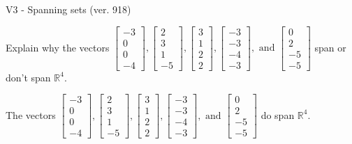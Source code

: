 \begin{exercise}
  \begin{exerciseTitle}V3 - Spanning sets (ver. 918)\end{exerciseTitle}
  \begin{exerciseStatement}
    Explain why the vectors \(\left[\begin{array}{r}
-3 \\
0 \\
0 \\
-4
\end{array}\right] , \left[\begin{array}{r}
2 \\
3 \\
1 \\
-5
\end{array}\right] , \left[\begin{array}{r}
3 \\
1 \\
2 \\
2
\end{array}\right] , \left[\begin{array}{r}
-3 \\
-3 \\
-4 \\
-3
\end{array}\right] , \text{ and } \left[\begin{array}{r}
0 \\
2 \\
-5 \\
-5
\end{array}\right]\) span or don't span \(\mathbb{R}^4\). 
	


  \end{exerciseStatement}
  \begin{exerciseAnswer}
   The vectors \(\left[\begin{array}{r}
-3 \\
0 \\
0 \\
-4
\end{array}\right] , \left[\begin{array}{r}
2 \\
3 \\
1 \\
-5
\end{array}\right] , \left[\begin{array}{r}
3 \\
1 \\
2 \\
2
\end{array}\right] , \left[\begin{array}{r}
-3 \\
-3 \\
-4 \\
-3
\end{array}\right] , \text{ and } \left[\begin{array}{r}
0 \\
2 \\
-5 \\
-5
\end{array}\right]\) 
  	 do  
	span \(\mathbb{R}^4\).
  



\end{exerciseAnswer}
\end{exercise}
